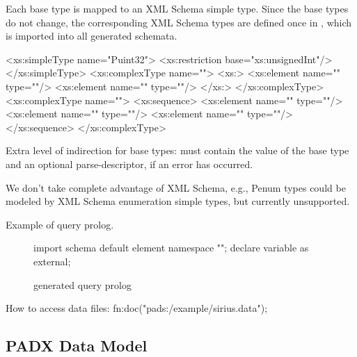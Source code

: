 Each base type is mapped to an XML Schema simple type.  Since the base
types do not change, the corresponding XML Schema types are defined
once in , which is imported into all generated schemata. 
\begin{small}
\begin{code}
<xs:simpleType name="Puint32">
  <xs:restriction base="xs:unsignedInt"/>
</xs:simpleType>
<xs:complexType name="">
  <xs:>
   <xs:element name="" type=""/>
   <xs:element name=""  type=""/>
  </xs:>
</xs:complexType>
<xs:complexType name="">
 <xs:sequence>
   <xs:element name=""  type=""/>
   <xs:element name="" type=""/>
   <xs:element name=""     type=""/>
 </xs:sequence>
</xs:complexType>
\end{code}
\end{small}



Extra level of indirection for base types: must contain the value of
the base type and an optional parse-descriptor, if an error has
occurred. 

We don't take complete advantage of XML Schema, e.g., Penum types
could be modeled by XML Schema enumeration simple types, but currently
unsupported.

Example of query prolog. 
\begin{figure*}
\begin{small}
\begin{code}
import schema default element namespace "";
declare variable  as  external; 
\end{code}
\end{small}
\caption{\padx{} generated query prolog}
\label{figure:padx-query-prolog}
\end{figure*}

How to access data files:  fn:doc("pads:/example/sirius.data");

\subsection{PADX Data Model}


